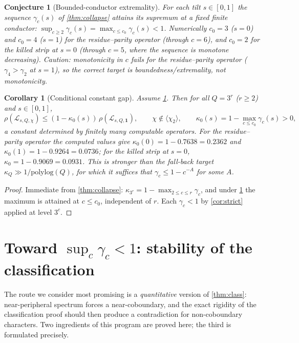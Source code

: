 \documentclass[11pt]{article}
\newcommand{\Lcal}{\mathcal{L}}
\theoremstyle{plain}
\newtheorem{corollary}{Corollary}
\newtheorem{conjecture}{Conjecture}
\theoremstyle{definition}
\theoremstyle{remark}
\begin{document}
\begin{conjecture}[Bounded-conductor extremality]\label{conj:ext}
For each tilt $s\in[0,1]$ the sequence $\gamma_c(s)$ of \cref{thm:collapse}
attains its supremum at a fixed finite conductor:
$\sup_{c\ge2}\gamma_c(s)=\max_{c\le c_0}\gamma_c(s)<1$. Numerically
$c_0=3$ ($s{=}0$) and $c_0=4$ ($s{=}1$) for the residue--parity operator
(through $c=6$), and $c_0=2$ for the killed strip at $s=0$ (through $c=5$, where
the sequence is monotone decreasing). Caution: monotonicity in $c$ \emph{fails}
for the residue--parity operator ($\gamma_4>\gamma_2$ at $s{=}1$), so the correct
target is boundedness/extremality, not monotonicity.
\end{conjecture}

\begin{corollary}[Conditional constant gap]\label{cor:const}
Assume \cref{conj:ext}. Then for all $Q=3^r$ ($r\ge2$) and $s\in[0,1]$,
\[
\rho(\Lcal_{s,Q,\chi})\le(1-\kappa_0(s))\,\rho(\Lcal_{s,Q,\mathbf1}),
\qquad \chi\notin\langle\chi_2\rangle,
\qquad
\kappa_0(s)=1-\max_{c\le c_0}\gamma_c(s)>0,
\]
a \emph{constant} determined by finitely many computable operators. For the
residue--parity operator the computed values give
$\kappa_0(0)=1-0.7638=0.2362$ and $\kappa_0(1)=1-0.9264=0.0736$; for the killed
strip at $s=0$, $\kappa_0=1-0.9069=0.0931$. This is stronger than the fall-back
target $\kappa_Q\gg1/\mathrm{polylog}(Q)$, for which it suffices that
$\gamma_c\le1-c^{-A}$ for some $A$.
\end{corollary}
\begin{proof}
Immediate from \cref{thm:collapse}: $\kappa_{3^r}=1-\max_{2\le c\le r}\gamma_c$,
and under \cref{conj:ext} the maximum is attained at $c\le c_0$, independent of
$r$. Each $\gamma_c<1$ by \cref{cor:strict} applied at level $3^c$.
\end{proof}

\section{Toward $\sup_c\gamma_c<1$: stability of the classification}
\label{sec:stability}

The route we consider most promising is a \emph{quantitative} version of
\cref{thm:class}: near-peripheral spectrum forces a near-coboundary, and the
exact rigidity of the classification proof should then produce a contradiction
for non-coboundary characters. Two ingredients of this program are proved here;
the third is formulated precisely.
\end{document}
